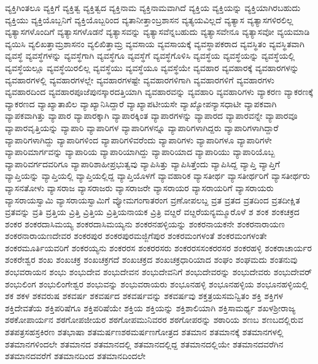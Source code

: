 {ವ್ಯಕ್ತಿಗಿಂತಲೂ
ವ್ಯಕ್ತಿಗೆ
ವ್ಯಕ್ತಿತ್ವ
ವ್ಯಕ್ತಿತ್ವದ
ವ್ಯಕ್ತಿನಾಮ
ವ್ಯಕ್ತಿನಾಮವಾಗಿದೆ
ವ್ಯಕ್ತಿಯ
ವ್ಯಕ್ತಿಯನ್ನು
ವ್ಯಕ್ತಿಯಾಗಿರಬಹುದು
ವ್ಯಕ್ತಿಯು
ವ್ಯಕ್ತಿಯೊಬ್ಬನಿಗೆ
ವ್ಯಕ್ತಿಯೊಬ್ಬರಿಂದ
ವ್ಯತಾನೀತ್ತಾಂಬ್ರಶಾಸನ
ವ್ಯತ್ಯಯವಿಲ್ಲದೆ
ವ್ಯತ್ಯಾಸ
ವ್ಯತ್ಯಾಸಗಳಿರಲಿಲ್ಲ
ವ್ಯತ್ಯಾಸಗಳೊಂದಿಗೆ
ವ್ಯತ್ಯಾಸಗಳೊಡನೆ
ವ್ಯತ್ಯಾಸವನ್ನು
ವ್ಯತ್ಯಾಸವೆನ್ನಬಹುದು
ವ್ಯತ್ಯಾಸವೇನೂ
ವ್ಯತ್ಯಾಸವೋ
ವ್ಯಯಮಾಡಿ
ವ್ಯಯಿಸಿ
ವ್ಯಲಿಖತ್ತಾಮ್ರಶಾಸನಂ
ವ್ಯಲಿಖಿತ್ತಾಮ್ರ
ವ್ಯವಸಾಯ
ವ್ಯವಸಾಯಕ್ಕೆ
ವ್ಯವಸ್ಥಾಪಕರಾದ
ವ್ಯವಸ್ಥಿತಂ
ವ್ಯವಸ್ಥಿತವಾಗಿ
ವ್ಯವಸ್ಥೆ
ವ್ಯವಸ್ಥೆಗಳನ್ನು
ವ್ಯವಸ್ಥೆಗಾಗಿ
ವ್ಯವಸ್ಥೆಗೂ
ವ್ಯವಸ್ಥೆಗೆ
ವ್ಯವಸ್ಥೆಗೊಳಿಸಿ
ವ್ಯವಸ್ಥೆಯ
ವ್ಯವಸ್ಥೆಯನ್ನು
ವ್ಯವಸ್ಥೆಯಲ್ಲಿ
ವ್ಯವಸ್ಥೆಯಲ್ಲೂ
ವ್ಯವಸ್ಥೆಯಿರಲಿಲ್ಲ
ವ್ಯವಸ್ಥೆಯು
ವ್ಯವಸ್ಥೆಯೂ
ವ್ಯವಸ್ಥೆಯೇ
ವ್ಯವಹಾರ
ವ್ಯವಹಾರಕ್ಕೆ
ವ್ಯವಹಾರಗಳನ್ನು
ವ್ಯವಹಾರಗಳಲ್ಲಿ
ವ್ಯವಹಾರಗಳಲ್ಲೇ
ವ್ಯವಹಾರಗಳಷ್ಟೇ
ವ್ಯವಹಾರಗಳಿಗಾಗಿ
ವ್ಯವಹಾರಗಳಿಗೆ
ವ್ಯವಹಾರಗಳು
ವ್ಯವಹಾರದಿಂದ
ವ್ಯವಹಾರಪೂಜೆಪುನಸ್ಕಾರದತ್ತಿಯಾಗಿ
ವ್ಯವಹಾರವನ್ನು
ವ್ಯವಹಾರಿ
ವ್ಯವಹಾರಿಗಳು
ವ್ಯಾಕರಣ
ವ್ಯಾಕರಣಕ್ಕೆ
ವ್ಯಾಕರಣದ
ವ್ಯಾಖ್ಯಾತಾಖಿಲ
ವ್ಯಾಖ್ಯಾನಿಸಿದ್ದಾರೆ
ವ್ಯಾಖ್ಯಾಪಟೀಯಸೇ
ವ್ಯಾಖ್ಯೋಪನ್ಯಾಸಧಾಟೀ
ವ್ಯಾಪಕವಾಗಿ
ವ್ಯಾಪಕವಾಗಿತ್ತು
ವ್ಯಾಪಾರ
ವ್ಯಾಪಾರಕ್ಕಾಗಿ
ವ್ಯಾಪಾರಕ್ಕಿಂತ
ವ್ಯಾಪಾರಗಳನ್ನು
ವ್ಯಾಪಾರದ
ವ್ಯಾಪಾರವನ್ನೇ
ವ್ಯಾಪಾರವೂ
ವ್ಯಾಪಾರವೃತ್ತಿಯನ್ನು
ವ್ಯಾಪಾರಿ
ವ್ಯಾಪಾರಿಗಳ
ವ್ಯಾಪಾರಿಗಳನ್ನೂ
ವ್ಯಾಪಾರಿಗಳಾಗಿದ್ದರು
ವ್ಯಾಪಾರಿಗಳಾಗಿದ್ದಾರೆ
ವ್ಯಾಪಾರಿಗಳಾಗಿದ್ದು
ವ್ಯಾಪಾರಿಗಳಿಂದ
ವ್ಯಾಪಾರಿಗಳಿವರೆಂದು
ವ್ಯಾಪಾರಿಗಳು
ವ್ಯಾಪಾರಿಗಳೂ
ವ್ಯಾಪಾರಿಗಳೇ
ವ್ಯಾಪಾರಿಮಾರ್ಗವನ್ನು
ವ್ಯಾಪಾರಿಯ
ವ್ಯಾಪಾರಿಯಾಗಿದ್ದು
ವ್ಯಾಪಾರಿಯಾದ
ವ್ಯಾಪಾರಿಯು
ವ್ಯಾಪಾರಿಯೊಬ್ಬ
ವ್ಯಾಪಾರಿವರ್ಗದವರಿಗೂ
ವ್ಯಾಪಾರಿಶಾಹೀಪ್ರಭುತ್ವವು
ವ್ಯಾಪಿಸಿತ್ತು
ವ್ಯಾಪಿಸಿತ್ತೆಂದು
ವ್ಯಾಪಿಸಿದ್ದ
ವ್ಯಾಪ್ತಿ
ವ್ಯಾಪ್ತಿಗೆ
ವ್ಯಾಪ್ತಿಯನ್ನು
ವ್ಯಾಪ್ತಿಯಲ್ಲಿ
ವ್ಯಾಪ್ತಿಯಲ್ಲಿದ್ದ
ವ್ಯಾಪ್ತಿಯೊಳಗೆ
ವ್ಯಾವಹಾರಿಕ
ವ್ಯಾಸತೀರ್ಥ
ವ್ಯಾಸತೀರ್ಥರಿಗೆ
ವ್ಯಾಸತೀರ್ಥರು
ವ್ಯಾಸನತೋಳು
ವ್ಯಾಸರಾಜ
ವ್ಯಾಸರಾಜರು
ವ್ಯಾಸರಾಜರೇ
ವ್ಯಾಸರಾಯರ
ವ್ಯಾಸರಾಯರಿಗೆ
ವ್ಯಾಸರಾಯರು
ವ್ಯಾಸರಾಯಸ್ವಾಮಿ
ವ್ಯಾಸರಾಯಸ್ವಾಮಿಗೆ
ವ್ಯೋಮಗಂಗಾತರಂಗ
ವ್ರಣೋಪಲಬ್ದ
ವ್ರತ
ವ್ರತದ
ವ್ರತದಿಂದ
ವ್ರತದೀಕ್ಷಿತ
ವ್ರತವನ್ನು
ವ್ರತಿ
ವ್ರತ್ತಿಯ
ವ್ರಿತ್ತಿ
ವ್ರಿತ್ತಿಯ
ವ್ರಿತ್ತಿಯನಾಯಕ
ವ್ರಿತ್ರಿ
ವೞ್ದರೆ
ವೞ್ದರೆಯನ್ಯಮ್ಮೂರೊಳೆ
ಶ
ಶಂಕ
ಶಂಕಚಕ್ರದ
ಶಂಕರ
ಶಂಕರದಾಸಿಮಯ್ಯ
ಶಂಕರದಾಸಿಮಯ್ಯನು
ಶಂಕರನಹಳ್ಳಿಯನ್ನು
ಶಂಕರನಾಯಕನೇ
ಶಂಕರನಾರಾಯಣ
ಶಂಕರನಾರಾಯಣದೇವರ
ಶಂಕರಪುರ
ಶಂಕರಪುರಮಜ್ಜಿಗೆಪುರ
ಶಂಕರಮಂಗಳಂತೆ
ಶಂಕರಮಂಗಳಂತೇ
ಶಂಕರಮೂರ್ತಿಯವರಿಗೆ
ಶಂಕರಯ್ಯನು
ಶಂಕರರಸ
ಶಂಕರರಸರು
ಶಂಕರರಸಸಂಕರರಸರ
ಶಂಕರಹಳ್ಳಿ
ಶಂಕರಾಚಾರ್ಯರ
ಶಂಕರೇಶ್ವರ
ಶಂಖ
ಶಂಖಚಕ್ರ
ಶಂಖಚಕ್ರಗದೆ
ಶಂಖಚಕ್ರದ
ಶಂಖಚಕ್ರಧಾರಿಯಾದ
ಶಂಘಂ
ಶಂಘಮದು
ಶಂತನುವು
ಶಂಭವರಾಯನ
ಶಂಭು
ಶಂಭುದೇವ
ಶಂಭುದೇವನ
ಶಂಭುದೇವನಿಗೆ
ಶಂಭುದೇವರನ್ನು
ಶಂಭುದೇವರು
ಶಂಭುದೇವರ್
ಶಂಭುಲಿಂಗ
ಶಂಭುಲಿಂಗೇಶ್ವರ
ಶಂಭುವನ್ನು
ಶಂಭುವರಾಯರು
ಶಂಭೂನಹಳ್ಳಿ
ಶಂಭೂನಹಳ್ಳಿಯ
ಶಂಭೂನಹಳ್ಳಿಯಲ್ಲಿ
ಶಕ
ಶಕಳ
ಶಕವರುಷ
ಶಕವರ್ಷ
ಶಕವರ್ಷದ
ಶಕವರ್ಷವನ್ನು
ಶಕವರ್ಷವು
ಶಕ್ತತ್ರಯಸಮನ್ವಿತಂ
ಶಕ್ತಿ
ಶಕ್ತಿಗಳ
ಶಕ್ತಿದೇವತೆಯ
ಶಕ್ತಿಪರಿಷೆಗೂ
ಶಕ್ತಿಪರಿಷೆಯೇ
ಶಕ್ತಿಯ
ಶಕ್ತಿಯನ್ನು
ಶಕ್ತಿಶಾಲಿಯಾಗಿ
ಶಕ್ತಿಸಾಮರ್ಥ್ಯ
ಶಖಳಶ್ರೀರಾಜ್ಯ
ಶಠಕೋಪಾರ್ಯನ
ಶಠಗೋಪಜೀಯರ
ಶಠಗೋಪಮುನಿವರರ
ಶಠಗೋಪರನ್ನು
ಶಠಾರಿಯ
ಶಣಬ
ಶಣಬದಲ್ಲಿರುವ
ಶತಪತ್ರಸಹಸ್ರಕಿರಣ
ಶತಭಾಷಾ
ಶತಮರ್ಷಣಶಠಮರ್ಷಣಗೋತ್ರದ
ಶತಮಾನ
ಶತಮಾನಕ್ಕೆ
ಶತಮಾನಗಳಲ್ಲಿ
ಶತಮಾನಗಳಿಂದಲೇ
ಶತಮಾನದ
ಶತಮಾನದಲ್ಲಿ
ಶತಮಾನದಲ್ಲಿದ್ದ
ಶತಮಾನದಲ್ಲಿಯೇ
ಶತಮಾನದವರೆಗಿನ
ಶತಮಾನದವರೆಗೆ
ಶತಮಾನದಿಂದ
ಶತಮಾನದಿಂದಲೇ
}
